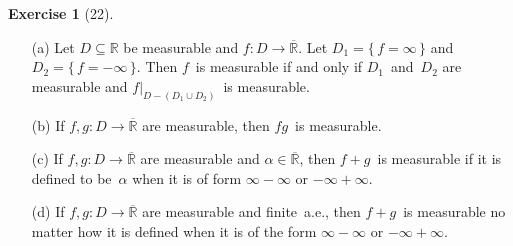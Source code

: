 \documentclass[letterpaper,12pt]{article}
\newcommand{\R}{\mathbb{R}}
\newcommand{\Rex}{\overline{\R}}
\newcommand{\union}{\cup}
\newcommand{\res}[2]{{#1}|_{#2}}
\theoremstyle{plain}
\theoremstyle{definition}
\newtheorem*{exer}{Exercise}
\theoremstyle{remark}
\begin{document}
\begin{exer}[22]\ 
\begin{enumerate}
\item[(a)] Let \(D\subseteq\R\) be measurable and \(f:D\to\Rex\). Let \(D_1=\{\,f=\infty\,\}\) and \(D_2=\{\,f=-\infty\,\}\). Then \(f\)~is measurable if and only if \(D_1\)~and~\(D_2\) are measurable and \(\res{f}{D-(D_1\union D_2)}\)~is measurable.
\item[(b)] If \(f,g:D\to\Rex\) are measurable, then \(fg\)~is measurable.
\item[(c)] If \(f,g:D\to\Rex\) are measurable and \(\alpha\in\Rex\), then \(f+g\)~is measurable if it is defined to be~\(\alpha\) when it is of form \(\infty-\infty\) or \(-\infty+\infty\).
\item[(d)] If \(f,g:D\to\Rex\) are measurable and finite~a.e., then \(f+g\)~is measurable no matter how it is defined when it is of the form \(\infty-\infty\) or \(-\infty+\infty\).
\end{enumerate}
\end{exer}
\end{document}
